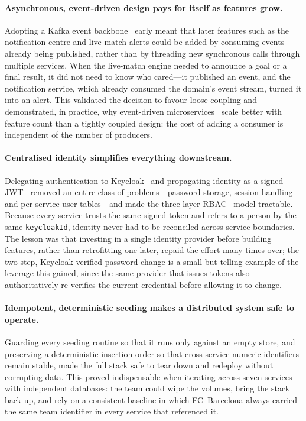 \paragraph{Asynchronous, event-driven design pays for itself as features grow.}
Adopting a Kafka event backbone~\cite{kafka} early meant that later features such as
the notification centre and live-match alerts could be added by consuming events already
being published, rather than by threading new synchronous calls through multiple
services. When the live-match engine needed to announce a goal or a final result, it did
not need to know who cared---it published an event, and the notification service, which
already consumed the domain's event stream, turned it into an alert. This validated the
decision to favour loose coupling and demonstrated, in practice, why event-driven
microservices~\cite{microservices} scale better with feature count than a tightly coupled
design: the cost of adding a consumer is independent of the number of producers.

\paragraph{Centralised identity simplifies everything downstream.}
Delegating authentication to Keycloak~\cite{keycloak} and propagating identity as a
signed JWT~\cite{jwt} removed an entire class of problems---password storage, session
handling and per-service user tables---and made the three-layer RBAC~\cite{rbac} model
tractable. Because every service trusts the same signed token and refers to a person by the
same \texttt{keycloakId}, identity never had to be reconciled across service boundaries.
The lesson was that investing in a single identity provider before building features,
rather than retrofitting one later, repaid the effort many times over; the two-step,
Keycloak-verified password change is a small but telling example of the leverage this
gained, since the same provider that issues tokens also authoritatively re-verifies the
current credential before allowing it to change.

\paragraph{Idempotent, deterministic seeding makes a distributed system safe to operate.}
Guarding every seeding routine so that it runs only against an empty store, and preserving a
deterministic insertion order so that cross-service numeric identifiers remain stable, made
the full stack safe to tear down and redeploy without corrupting data. This proved
indispensable when iterating across seven services with independent databases: the team
could wipe the volumes, bring the stack back up, and rely on a consistent baseline in which
FC~Barcelona always carried the same team identifier in every service that referenced it.

